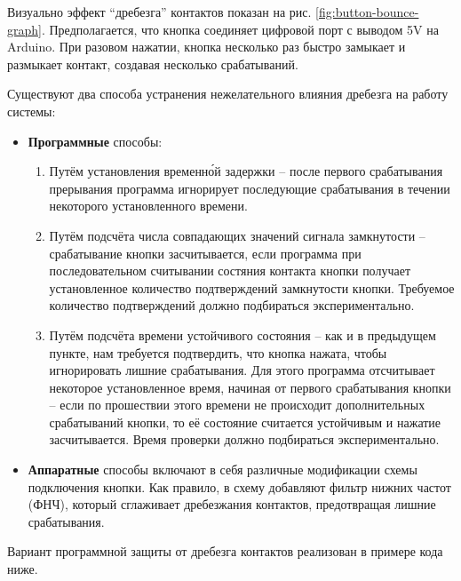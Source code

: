 \documentclass[../sparc.tex]{subfiles}
\begin{document}
Визуально эффект ``дребезга'' контактов показан на
рис. \ref{fig:button-bounce-graph}.  Предполагается, что кнопка соединяет
цифровой порт с выводом 5V на Arduino.  При разовом нажатии, кнопка несколько
раз быстро замыкает и размыкает контакт, создавая несколько срабатываний.

Существуют два способа устранения нежелательного влияния дребезга на работу
системы:
\begin{itemize}
\item \textbf{Программные} способы:
  \begin{enumerate}
  \item Путём установления временн\'ой задержки -- после первого срабатывания
    прерывания программа игнорирует последующие срабатывания в течении
    некоторого установленного времени.
  \item Путём подсчёта числа совпадающих значений сигнала замкнутости --
    срабатывание кнопки засчитывается, если программа при последовательном
    считывании состяния контакта кнопки получает установленное количество
    подтверждений замкнутости кнопки.  Требуемое количество подтверждений должно
    подбираться экспериментально.
  \item Путём подсчёта времени устойчивого состояния -- как и в предыдущем
    пункте, нам требуется подтвердить, что кнопка нажата, чтобы игнорировать
    лишние срабатывания.  Для этого программа отсчитывает некоторое
    установленное время, начиная от первого срабатывания кнопки -- если по
    прошествии этого времени не происходит дополнительных срабатываний кнопки,
    то её состояние считается устойчивым и нажатие засчитывается.  Время
    проверки должно подбираться экспериментально.
  \end{enumerate}
\item \textbf{Аппаратные} способы включают в себя различные модификации схемы
  подключения кнопки.  Как правило, в схему добавляют фильтр нижних частот
  (ФНЧ), который сглаживает дребезжания контактов, предотвращая лишние
  срабатывания.
\end{itemize}

Вариант программной защиты от дребезга контактов реализован в примере кода ниже.
\end{document}
